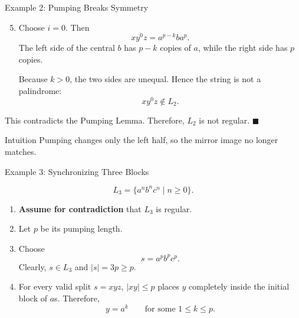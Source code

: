 \documentclass[10pt,aspectratio=169]{beamer}
\begin{document}
\begin{frame}{Example 2: Pumping Breaks Symmetry}

\small
\begin{enumerate}
    \setcounter{enumi}{4}
    \item Choose $i=0$. Then
    \[
    xy^0z=a^{p-k}ba^p.
    \]
    The left side of the central $b$ has $p-k$ copies of $a$, while the right side has $p$ copies.

    Because $k>0$, the two sides are unequal. Hence the string is not a palindrome:
    \[
    xy^0z\notin L_2.
    \]
\end{enumerate}

This contradicts the Pumping Lemma. Therefore, $L_2$ is not regular.
\hfill $\blacksquare$

\vspace{0.7em}
\begin{block}{Intuition}
Pumping changes only the left half, so the mirror image no longer matches.
\end{block}

\end{frame}

\begin{frame}{Example 3: Synchronizing Three Blocks}

\small
\[
L_3=\{a^nb^nc^n\mid n\geq 0\}.
\]

\begin{enumerate}
    \item \textbf{Assume for contradiction} that $L_3$ is regular.
    \item Let $p$ be its pumping length.
    \item Choose
    \[
    s=a^pb^pc^p.
    \]
    Clearly, $s\in L_3$ and $|s|=3p\geq p$.
    \item For every valid split $s=xyz$, $|xy|\leq p$ places $y$ completely inside the initial block of $a$s. Therefore,
    \[
    y=a^k\qquad\text{for some }1\leq k\leq p.
    \]
\end{enumerate}

\end{frame}
\end{document}
